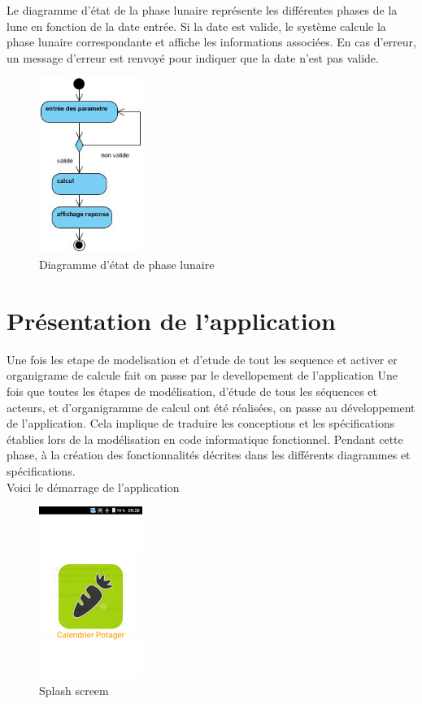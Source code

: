 Le diagramme d'état de la phase lunaire représente les différentes phases de la lune en fonction de la date entrée. Si la date est valide, le système calcule la phase lunaire correspondante et affiche les informations associées. En cas d'erreur, un message d'erreur est renvoyé pour indiquer que la date n'est pas valide.
			\begin{figure}[!h]
    	\center
    		\includegraphics[width=0.3\textwidth]{image/diagrame2/phase_lunaire.jpg}
   		\caption{Diagramme d'état de phase lunaire}
    	\label{Diagramme d'état de phase lunaire}
	\end{figure}
\section{Présentation de l'application}
Une fois les etape de modelisation et d’etude de tout les sequence et activer er organigrame de calcule fait on passe par le devellopement de l’application 
Une fois que toutes les étapes de modélisation, d'étude de tous les séquences et acteurs, et d'organigramme de calcul ont été réalisées, on passe au développement de l'application. Cela implique de traduire les conceptions et les spécifications établies lors de la modélisation en code informatique fonctionnel. Pendant cette phase, à la création des fonctionnalités décrites dans les différents diagrammes et spécifications. \\
Voici le démarrage de l'application\\
\begin{figure}[!h]
    	\center
    		\includegraphics[width=0.3\textwidth]{image/1}
   		\caption{Splash screem}
    	\label{Splash screem}
	\end{figure}\\ 

